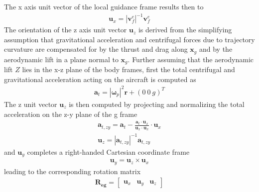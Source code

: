 \documentclass{ifacconf}
\newcommand{\mbf}[1]{\mathbf{#1}}
\providecommand{\mbf}[1]{\mathbf{#1}}
\newcommand{\Reg}{{\ensuremath{\mbf{R_{e  g}}}}}
\begin{document}
The x axis unit vector of the local guidance frame results then to
\begin{align}
\mbf{u}_x = |\mbf{v}_f^e|^{-1}\mbf{v}_f^e
\end{align}
The orientation of the z axis unit vector $\mbf{u}_z$ is derived from the simplifying assumption that gravitational acceleration and centrifugal forces due to trajectory curvature are compensated for by the thrust and drag along $\mbf{x}_g$ and by the aerodynamic lift in a plane normal to $\mbf{x}_g$. Further assuming that the aerodynamic lift $Z$ lies in the x-z plane of the body frames, first the total centrifugal and gravitational acceleration acting on the aircraft is computed as
\begin{align}
\mbf{a}_{t} = |\mbf{\omega}_{p}|^2 \mbf{r} + (0 \: 0 \: g)^T
\end{align}
The z unit vector $\mbf{u}_z$ is then computed by projecting and normalizing the total acceleration on the z-y plane of the g frame
\begin{align}
\mbf{a}_{t,zy} = \mbf{a}_t - \frac{\mbf{a}_t \cdot \mbf{u}_x}{\mbf{u}_x \cdot \mbf{u}_x} \cdot \mbf{u}_x \\
\mbf{u}_z = |\mbf{a}_{t,zy}|^{-1}\mbf{a}_{t,zy}
\end{align}
and $\mbf{u}_y$ completes a right-handed Cartesian coordinate frame
\begin{align}
\mbf{u}_y = \mbf{u}_z \times \mbf{u}_x
\end{align}
leading to the corresponding rotation matrix
\begin{align}
\Reg 
=
\begin{bmatrix}
\mbf{u}_x & 
\mbf{u}_y &
\mbf{u}_z
\end{bmatrix}
\end{align}
%
\end{document}
